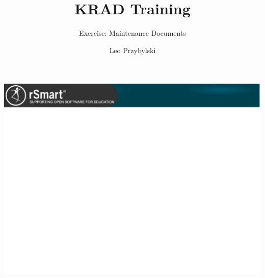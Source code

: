 \documentclass[xcolor=dvipsnames,14pt,professionalfonts]{beamer}
\begin{document}
\title{KRAD Training}
\subtitle{Exercise: Maintenance Documents}
\author[Leo]{Leo Przybylski}

\usebackgroundtemplate%
{%
    \includegraphics[width=\paperwidth,height=\paperheight]{../img/header.png}%
}

{
%
\begin{frame}[plain]
  \titlepage
\end{frame}
}
\end{document}
